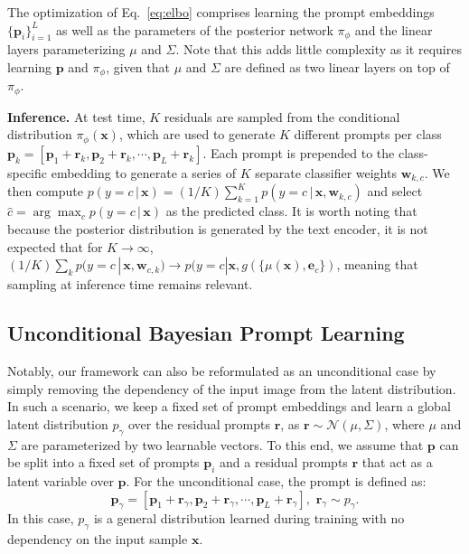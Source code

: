 \documentclass[10pt,twocolumn,letterpaper]{article}
\newcommand{\x}{\mathbf{x}}
\newcommand{\w}{\mathbf{w}}
\newcommand{\e}{\mathbf{e}}
\newcommand{\p}{\mathbf{p}}
\def\rvr{{\mathbf{r}}}
\def\rvr{{\mathbf{r}}}
\begin{document}
The optimization of Eq.~\ref{eq:elbo} comprises learning the prompt embeddings $\{\p_i\}_{i=1}^L$ as well as the parameters of the posterior network $\pi_\phi$ and the linear layers parameterizing $\mu$ and $\Sigma$. Note that this adds little complexity as it requires learning $\p$ and $\pi_\phi$, given that $\mu$ and $\Sigma$ are defined as two linear layers on top of $\pi_\phi$.

\textbf{Inference.} At test time, $K$ residuals are sampled from the conditional distribution $\pi_\phi(\x)$, which are used to generate $K$ different prompts per class $\p_{k} {=} [\p_1 + \rvr_k, \p_2 + \rvr_k, \cdots, \p_L + \rvr_k]$. Each prompt is prepended to the class-specific embedding to generate a series of $K$ separate classifier weights $\w_{k,c}$. We then compute $p(y {=} c \,| \, \x) {=} (1/K) \sum_{k=1}^K p(y {=} c \, | \, \x, \w_{k,c})$ and select $\hat{c} {=} \arg \max_{c} p(y {=} c \, | \, \x)$ as the predicted class. It is worth noting that because the posterior distribution is generated by the text encoder, it is not expected that for $K \rightarrow \infty$, $(1/K) \sum_{k} p( y {=} c \, | \, \x, \w_{c,k}) \rightarrow p( y {=} c | \x, g(\{\mu(\x), \e_c\})$, meaning that sampling at inference time remains relevant. 



\subsection{Unconditional Bayesian Prompt Learning}
\label{ssec:method_unconditional}
Notably, our framework can also be reformulated as an unconditional case  by simply removing the dependency of the input image from the latent distribution. In such a scenario, we keep a fixed set of prompt embeddings and learn a global latent distribution $p_\gamma$ over the residual prompts $\rvr$, as $\rvr \sim \mathcal{N}( \mu, \Sigma)$, where $\mu$ and $\Sigma$ are parameterized by two learnable vectors. To this end, we assume that $\p$ can be split into a fixed set of prompts $\p_i$ and a residual prompts $\rvr$ that act as a latent variable over $\p$. For the unconditional case, the prompt is defined as:
\begin{equation}
    \label{eq:unconditional_prompt}
\p_\gamma = [\p_1 + \rvr_\gamma, \p_2 + \rvr_\gamma, \cdots, \p_L + \rvr_\gamma], \, \, \rvr_\gamma \sim p_\gamma.
\end{equation}
In this case, $p_\gamma$ is a general distribution learned during training with no dependency on the input sample $\x$. 
\end{document}
